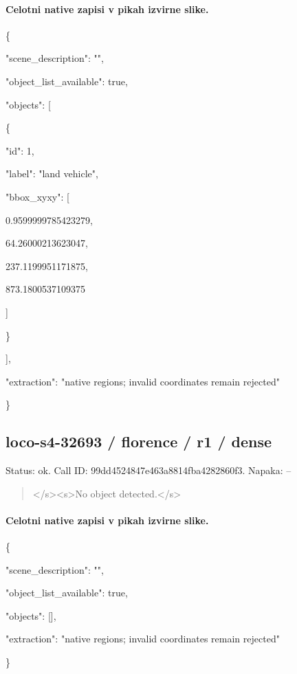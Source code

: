 \documentclass[10pt,a4paper]{article}
\begin{document}
\paragraph{Celotni native zapisi v pikah izvirne slike.}
\{\par
  "scene\_description":\allowbreak{} "",\allowbreak{}\par
  "object\_list\_available":\allowbreak{} true,\allowbreak{}\par
  "objects":\allowbreak{} [\par
    \{\par
      "id":\allowbreak{} 1,\allowbreak{}\par
      "label":\allowbreak{} "land vehicle",\allowbreak{}\par
      "bbox\_xyxy":\allowbreak{} [\par
        0.9599999785423279,\allowbreak{}\par
        64.26000213623047,\allowbreak{}\par
        237.1199951171875,\allowbreak{}\par
        873.1800537109375\par
      ]\par
    \}\par
  ],\allowbreak{}\par
  "extraction":\allowbreak{} "native regions; invalid coordinates remain rejected"\par
\}
\subsection*{loco-s4-32693 / florence / r1 / dense}
Status: ok. Call ID: 99dd4524847e463a8814fba4282860f3. Napaka: --
\begin{quote}\footnotesize
</s>\allowbreak{}<s>\allowbreak{}No object detected.</s>\allowbreak{}
\end{quote}
\paragraph{Celotni native zapisi v pikah izvirne slike.}
\{\par
  "scene\_description":\allowbreak{} "",\allowbreak{}\par
  "object\_list\_available":\allowbreak{} true,\allowbreak{}\par
  "objects":\allowbreak{} [],\allowbreak{}\par
  "extraction":\allowbreak{} "native regions; invalid coordinates remain rejected"\par
\}
\end{document}
